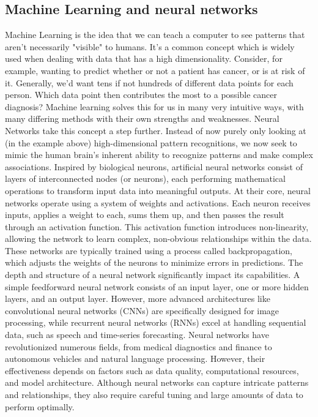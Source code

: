 \documentclass{article}
\begin{document}
\subsection{Machine Learning and neural networks}
Machine Learning is the idea that we can teach a computer to see patterns that aren't necessarily "visible" to humans. It's a common concept which is widely used when dealing with data that has a high dimensionality. Consider, for example, wanting to predict whether or not a patient has cancer, or is at risk of it. Generally, we'd want tens if not hundreds of different data points for each person. Which data point then contributes the most to a possible cancer diagnosis? Machine learning solves this for us in many very intuitive ways, with many differing methods with their own strengths and weaknesses.
\newline
Neural Networks take this concept a step further. Instead of now purely only looking at (in the example above) high-dimensional pattern recognitions, we now seek to mimic the human brain's inherent ability to recognize patterns and make complex associations. Inspired by biological neurons, artificial neural networks consist of layers of interconnected nodes (or neurons), each performing mathematical operations to transform input data into meaningful outputs.
\newline
At their core, neural networks operate using a system of weights and activations. Each neuron receives inputs, applies a weight to each, sums them up, and then passes the result through an activation function. This activation function introduces non-linearity, allowing the network to learn complex, non-obvious relationships within the data. These networks are typically trained using a process called backpropagation, which adjusts the weights of the neurons to minimize errors in predictions.
\newline
The depth and structure of a neural network significantly impact its capabilities. A simple feedforward neural network consists of an input layer, one or more hidden layers, and an output layer. However, more advanced architectures like convolutional neural networks (CNNs) are specifically designed for image processing, while recurrent neural networks (RNNs) excel at handling sequential data, such as speech and time-series forecasting.
\newline
Neural networks have revolutionized numerous fields, from medical diagnostics and finance to autonomous vehicles and natural language processing. However, their effectiveness depends on factors such as data quality, computational resources, and model architecture. Although neural networks can capture intricate patterns and relationships, they also require careful tuning and large amounts of data to perform optimally.
\end{document}

